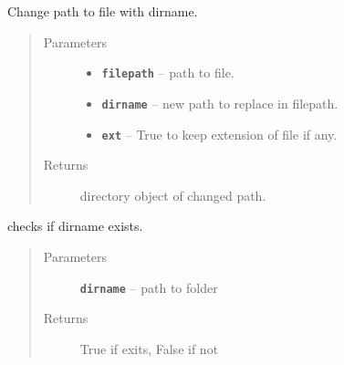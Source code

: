 \documentclass[letterpaper,10pt,english]{sphinxmanual}
\begin{document}
\begin{fulllineitems}
\label{RRtoolbox.lib:RRtoolbox.lib.directory.changedir}
Change path to file with dirname.
\begin{quote}\begin{description}
\item[{Parameters}] \leavevmode\begin{itemize}
\item {} 
\textbf{\texttt{filepath}} -- path to file.

\item {} 
\textbf{\texttt{dirname}} -- new path to replace in filepath.

\item {} 
\textbf{\texttt{ext}} -- True to keep extension of file if any.

\end{itemize}

\item[{Returns}] \leavevmode
directory object of changed path.

\end{description}\end{quote}

\end{fulllineitems}


\begin{fulllineitems}
\label{RRtoolbox.lib:RRtoolbox.lib.directory.checkDir}
checks if dirname exists.
\begin{quote}\begin{description}
\item[{Parameters}] \leavevmode
\textbf{\texttt{dirname}} -- path to folder

\item[{Returns}] \leavevmode
True if exits, False if not

\end{description}\end{quote}

\end{fulllineitems}

\end{document}
